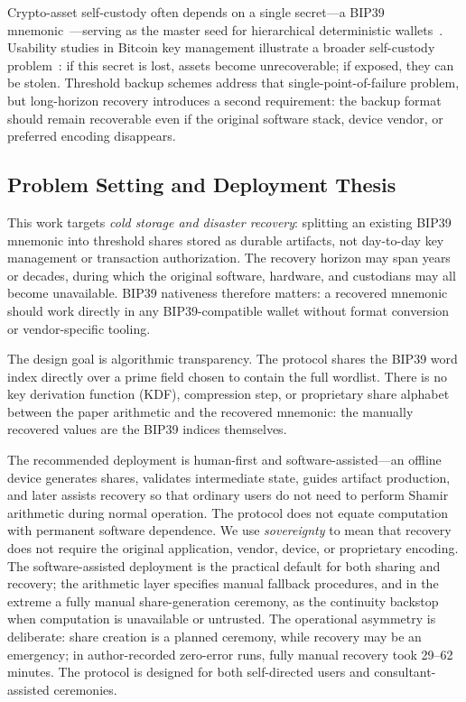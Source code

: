 \documentclass[11pt]{article}
\begin{document}
Crypto-asset self-custody often depends on a single secret---a BIP39 mnemonic~\cite{bip39}---serving as the master seed for hierarchical deterministic wallets~\cite{bip32}. Usability studies in Bitcoin key management illustrate a broader self-custody problem~\cite{eskandari2015}: if this secret is lost, assets become unrecoverable; if exposed, they can be stolen. Threshold backup schemes address that single-point-of-failure problem, but long-horizon recovery introduces a second requirement: the backup format should remain recoverable even if the original software stack, device vendor, or preferred encoding disappears.

\subsection{Problem Setting and Deployment Thesis}

This work targets \emph{cold storage and disaster recovery}: splitting an existing BIP39 mnemonic into threshold shares stored as durable artifacts, not day-to-day key management or transaction authorization. The recovery horizon may span years or decades, during which the original software, hardware, and custodians may all become unavailable. BIP39 nativeness therefore matters: a recovered mnemonic should work directly in any BIP39-compatible wallet without format conversion or vendor-specific tooling.

The design goal is algorithmic transparency. The protocol shares the BIP39 word index directly over a prime field chosen to contain the full wordlist. There is no key derivation function (KDF), compression step, or proprietary share alphabet between the paper arithmetic and the recovered mnemonic: the manually recovered values are the BIP39 indices themselves.

The recommended deployment is human-first and software-assisted---an offline device generates shares, validates intermediate state, guides artifact production, and later assists recovery so that ordinary users do not need to perform Shamir arithmetic during normal operation. The protocol does not equate computation with permanent software dependence. We use \emph{sovereignty} to mean that recovery does not require the original application, vendor, device, or proprietary encoding. The software-assisted deployment is the practical default for both sharing and recovery; the arithmetic layer specifies manual fallback procedures, and in the extreme a fully manual share-generation ceremony, as the continuity backstop when computation is unavailable or untrusted. The operational asymmetry is deliberate: share creation is a planned ceremony, while recovery may be an emergency; in author-recorded zero-error runs, fully manual recovery took 29--62 minutes. The protocol is designed for both self-directed users and consultant-assisted ceremonies.
\end{document}
